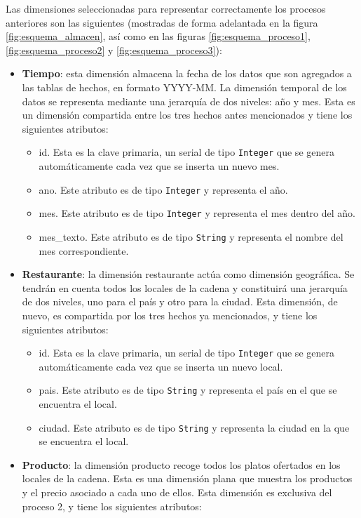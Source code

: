 \documentclass[12pt]{opticajnl}
\begin{document}
Las dimensiones seleccionadas para representar correctamente los procesos anteriores son las siguientes (mostradas de forma adelantada en la figura \ref{fig:esquema_almacen}, así como en las figuras \ref{fig:esquema_proceso1}, \ref{fig:esquema_proceso2} y \ref{fig:esquema_proceso3}):
\begin{itemize}
\item \textbf{Tiempo}: esta dimensión almacena la fecha de los datos que son agregados a las tablas de hechos, en formato YYYY-MM. La dimensión temporal de los datos se representa mediante una jerarquía de dos niveles: año y mes. Esta es un dimensión compartida entre los tres hechos antes mencionados y tiene los siguientes atributos:
\begin{itemize}
\item id. Esta es la clave primaria, un serial de tipo \texttt{Integer} que se genera automáticamente cada vez que se inserta un nuevo mes.
\item ano. Este atributo es de tipo \texttt{Integer} y representa el año.
\item mes. Este atributo es de tipo \texttt{Integer} y representa el mes dentro del año.
\item mes\_texto. Este atributo es de tipo \texttt{String} y representa el nombre del mes correspondiente.
\end{itemize}
\item \textbf{Restaurante}: la dimensión restaurante actúa como dimensión geográfica. Se tendrán en cuenta todos los locales de la cadena y constituirá una jerarquía de dos niveles, uno para el país y otro para la ciudad. Esta dimensión, de nuevo, es compartida por los tres hechos ya mencionados, y tiene los siguientes atributos:
\begin{itemize}
\item id. Esta es la clave primaria, un serial de tipo \texttt{Integer} que se genera automáticamente cada vez que se inserta un nuevo local.
\item pais. Este atributo es de tipo \texttt{String} y representa el país en el que se encuentra el local.
\item ciudad. Este atributo es de tipo \texttt{String} y representa la ciudad en la que se encuentra el local.
\end{itemize}
\item \textbf{Producto}: la dimensión producto recoge todos los platos ofertados en los locales de la cadena. Esta es una dimensión plana que muestra los productos y el precio asociado a cada uno de ellos. Esta dimensión es exclusiva del proceso 2, y tiene los siguientes atributos:

\end{itemize}
\end{document}
